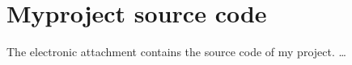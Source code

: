 \chapter{Myproject source code}\label{app:code}

The electronic attachment contains the source code of my project. \ldots
